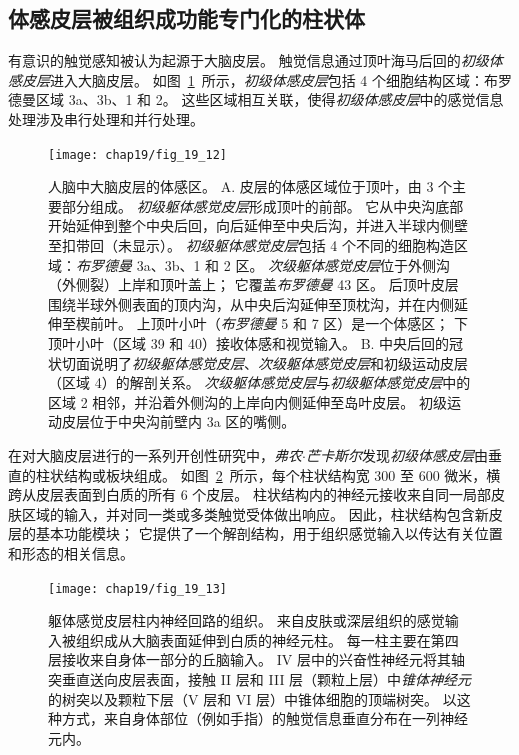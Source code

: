 \subsection{体感皮层被组织成功能专门化的柱状体}

有意识的触觉感知被认为起源于大脑皮层。
触觉信息通过顶叶海马后回的\textit{初级体感皮层}进入大脑皮层。
如图~\ref{fig:19_12}~所示，\textit{初级体感皮层}包括 4 个细胞结构区域：布罗德曼区域 3a、3b、1 和 2。
这些区域相互关联，使得\textit{初级体感皮层}中的感觉信息处理涉及串行处理和并行处理。


\begin{figure}[htbp]
	\centering
	\texttt{[image: chap19/fig\_19\_12]}
	\caption{人脑中大脑皮层的体感区。
		A. 皮层的体感区域位于顶叶，由 3 个主要部分组成。
		\textit{初级躯体感觉皮层}形成顶叶的前部。
		它从中央沟底部开始延伸到整个中央后回，向后延伸至中央后沟，并进入半球内侧壁至扣带回（未显示）。
		\textit{初级躯体感觉皮层}包括 4 个不同的细胞构造区域：\textit{布罗德曼} 3a、3b、1 和 2 区。
		\textit{次级躯体感觉皮层}位于外侧沟（外侧裂）上岸和顶叶盖上；
		它覆盖\textit{布罗德曼} 43 区。
		后顶叶皮层围绕半球外侧表面的顶内沟，从中央后沟延伸至顶枕沟，并在内侧延伸至楔前叶。
		上顶叶小叶（\textit{布罗德曼}  5 和 7 区）是一个体感区；
		下顶叶小叶（区域 39 和 40）接收体感和视觉输入。
		B. 中央后回的冠状切面说明了\textit{初级躯体感觉皮层}、\textit{次级躯体感觉皮层}和初级运动皮层（区域 4）的解剖关系。
		\textit{次级躯体感觉皮层}与\textit{初级躯体感觉皮层}中的区域 2 相邻，并沿着外侧沟的上岸向内侧延伸至岛叶皮层。
		初级运动皮层位于中央沟前壁内 3a 区的嘴侧。}
	\label{fig:19_12}
\end{figure}


在对大脑皮层进行的一系列开创性研究中，\textit{弗农$\cdot$芒卡斯尔}发现\textit{初级体感皮层}由垂直的柱状结构或板块组成。
如图~\ref{fig:19_13}~所示，每个柱状结构宽 300 至 600 微米，横跨从皮层表面到白质的所有 6 个皮层。
柱状结构内的神经元接收来自同一局部皮肤区域的输入，并对同一类或多类触觉受体做出响应。
因此，柱状结构包含新皮层的基本功能模块；
它提供了一个解剖结构，用于组织感觉输入以传达有关位置和形态的相关信息。


\begin{figure}[htbp]
	\centering
	\texttt{[image: chap19/fig\_19\_13]}
	\caption{躯体感觉皮层柱内神经回路的组织。
		来自皮肤或深层组织的感觉输入被组织成从大脑表面延伸到白质的神经元柱。
		每一柱主要在第四层接收来自身体一部分的丘脑输入。
		IV 层中的兴奋性神经元将其轴突垂直送向皮层表面，接触 II 层和 III 层（颗粒上层）中\textit{锥体神经元}的树突以及颗粒下层（V 层和 VI 层）中锥体细胞的顶端树突。
		以这种方式，来自身体部位（例如手指）的触觉信息垂直分布在一列神经元内。}
	\label{fig:19_13}
\end{figure}


